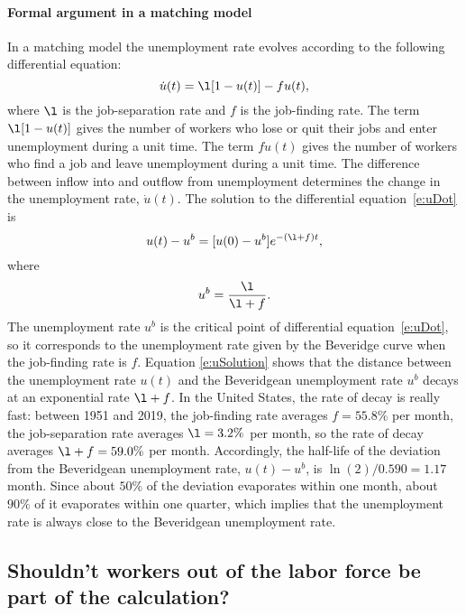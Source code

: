 \documentclass[letterpaper,12pt,leqno]{article}
\begin{document}
 \paragraph{Formal argument in a matching model \citep[p. 7]{MS16}} In a matching model the unemployment rate evolves according to the following differential equation:
\begin{equation}
\dot{u}(t) = \l [1-u(t)] - f u(t),
\label{e:uDot}\end{equation}
where $\l$ is the job-separation rate and $f$ is the job-finding rate. The term $\l [1-u(t)]$ gives the number of workers who lose or quit their jobs and enter unemployment during a unit time. The term $f u(t)$ gives the number of workers who find a job and leave unemployment during a unit time. The difference between inflow into and outflow from unemployment determines the change in the unemployment rate, $\dot{u}(t)$. The solution to the differential equation~\eqref{e:uDot} is
\begin{equation}
u(t) - u^b = [u(0) - u^b] e^{-(\l+f)t},
\label{e:uSolution}\end{equation}
where
\begin{equation*}
u^b = \frac{\l}{\l+f}.
\end{equation*}
The unemployment rate $u^b$ is the critical point of differential equation~\eqref{e:uDot}, so it corresponds to the unemployment rate given by the Beveridge curve when the job-finding rate is $f$. Equation \eqref{e:uSolution} shows that the distance between the unemployment rate $u(t)$ and the Beveridgean unemployment rate $u^b$ decays at an exponential rate $\l+f$. In the United States, the rate of decay is really fast: between 1951 and 2019, the job-finding rate averages $f = 55.8\%$ per month, the job-separation rate averages $\l = 3.2\%$ per month, so the rate of decay averages $\l+f = 59.0 \%$ per month. Accordingly, the half-life of the deviation from the Beveridgean unemployment rate, $u(t)-u^b$, is $\ln(2)/0.590 = 1.17$ month. Since about $50\%$ of the deviation evaporates within one month, about $90\%$ of it evaporates within one quarter, which implies that the unemployment rate is always close to the Beveridgean unemployment rate.

\subsection{Shouldn't workers out of the labor force be part of the calculation?}
\end{document}
